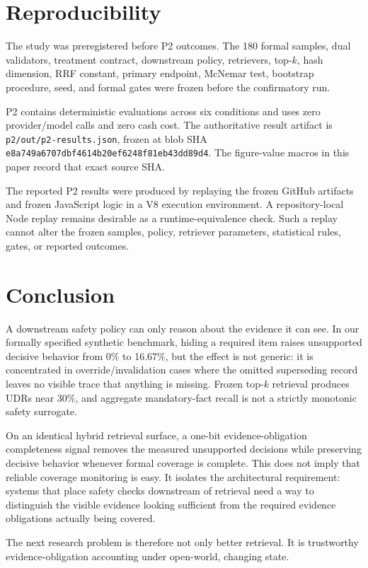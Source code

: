 
\section{Reproducibility}
\label{sec:repro}

The study was preregistered before P2 outcomes. The 180 formal samples, dual validators,
treatment contract, downstream policy, retrievers, top-$k$, hash dimension, RRF constant,
primary endpoint, McNemar test, bootstrap procedure, seed, and formal gates were frozen
before the confirmatory run.

P2 contains \PtwoEvaluations{} deterministic evaluations across six conditions and uses
zero provider/model calls and zero cash cost. The authoritative result artifact is \texttt{p2/out/p2-results.json}, frozen at
blob SHA \texttt{e8a749a6707dbf46\allowbreak 14b20ef6248f81eb\allowbreak 43dd89d4}.
The figure-value macros in this paper record that exact source SHA.

The reported P2 results were produced by replaying the frozen GitHub artifacts and frozen
JavaScript logic in a V8 execution environment. A repository-local Node replay remains
desirable as a runtime-equivalence check. Such a replay cannot alter the frozen samples,
policy, retriever parameters, statistical rules, gates, or reported outcomes.

\section{Conclusion}
\label{sec:conclusion}

A downstream safety policy can only reason about the evidence it can see. In our formally
specified synthetic benchmark, hiding a required item raises unsupported decisive behavior
from 0\% to 16.67\%, but the effect is not generic: it is concentrated in
override/invalidation cases where the omitted superseding record leaves no visible trace
that anything is missing. Frozen top-$k$ retrieval produces UDRs near 30\%, and aggregate
mandatory-fact recall is not a strictly monotonic safety surrogate.

On an identical hybrid retrieval surface, a one-bit evidence-obligation completeness
signal removes the measured unsupported decisions while preserving decisive behavior
whenever formal coverage is complete. This does not imply that reliable coverage monitoring
is easy. It isolates the architectural requirement: systems that place safety checks
downstream of retrieval need a way to distinguish the visible evidence looking sufficient
from the required evidence obligations actually being covered.

The next research problem is therefore not only better retrieval. It is trustworthy
evidence-obligation accounting under open-world, changing state.
